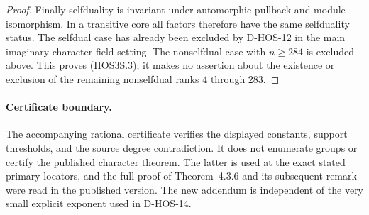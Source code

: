 \begin{proof}
Finally selfduality is invariant under automorphic pullback and
module isomorphism. In a transitive core all factors therefore
have the same selfduality status. The selfdual case has already
been excluded by D-HOS-12 in the main imaginary-character-field
setting. The nonselfdual case with $n\ge284$ is excluded above.
This proves (HOS3S.3); it makes no assertion about the existence
or exclusion of the remaining nonselfdual ranks $4$ through $283$.
\end{proof}

\paragraph{Certificate boundary.}
The accompanying rational certificate verifies the displayed
constants, support thresholds, and the source degree contradiction.
It does not enumerate groups or certify the published character
theorem. The latter is used at the exact stated primary locators,
and the full proof of Theorem~4.3.6 and its subsequent remark were
read in the published version. The new addendum is independent
of the very small explicit exponent used in D-HOS-14.
